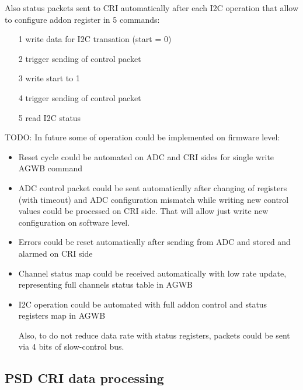 \documentclass{article}
\begin{document}
Also status packets sent to CRI automatically after each I2C operation that allow to configure addon register in 5 commands:

\begin{itemize}
\item[1] write data for I2C transation (start = 0)
\item[2] trigger sending of control packet
\item[3] write start to 1
\item[4] trigger sending of control packet
\item[5] read I2C status
\end{itemize}


TODO: In future some of operation could be implemented on firmware level:
 
\begin{itemize}
\item Reset cycle could be automated on ADC and CRI sides for single write AGWB command
\item ADC control packet could be sent automatically after changing of registers (with timeout) and ADC configuration mismatch while writing new control values could be processed on CRI side. That will allow just write new configuration on software level.
\item Errors could be reset automatically after sending from ADC and stored and alarmed on CRI side
\item Channel status map could be received automatically with low rate update, representing full channels status table in AGWB
\item I2C operation could be automated with full addon control and status registers map in AGWB

Also, to do not reduce data rate with status registers, packets could be sent via 4 bits of slow-control bus.

\end{itemize}









\subsection{PSD CRI data processing}
\end{document}
